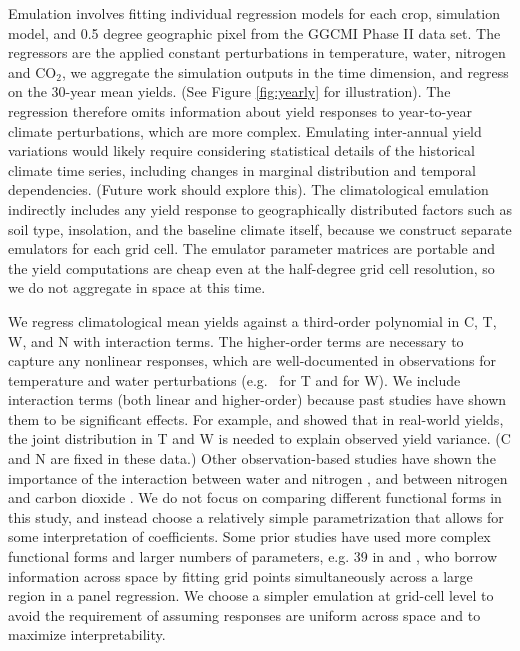 \documentclass[preprint, 5p, times, twocolumn]{elsarticle}
\begin{document}
Emulation involves fitting individual regression models for each crop, simulation model, and 0.5 degree geographic pixel from the GGCMI Phase II data set. The regressors are the applied constant perturbations in temperature, water, nitrogen and CO$_2$, we aggregate the simulation outputs in the time dimension, and regress on the 30-year mean yields. (See Figure \ref{fig:yearly} for illustration). The regression therefore omits information about yield responses to year-to-year climate perturbations, which are more complex. Emulating inter-annual yield variations would likely require considering statistical details of the historical climate time series, including changes in marginal distribution and temporal dependencies. (Future work should explore this). The climatological emulation indirectly includes any yield response to geographically distributed factors such as soil type, insolation, and the baseline climate itself, because we construct separate emulators for each grid cell. The emulator parameter matrices are portable and the yield computations are cheap even at the half-degree grid cell resolution, so we do not aggregate in space at this time.

We regress climatological mean yields against a third-order polynomial in C, T, W, and N with interaction terms. The higher-order terms are necessary to capture any nonlinear responses, which are well-documented in observations for temperature and water perturbations (e.g.\ \citet{Schlenker2009} for T and \citet{He2016} for W). We include interaction terms (both linear and higher-order) because past studies have shown them to be significant effects. For example, \citet{Lobell2007} and \citet{Tebaldi2008} showed that in real-world yields, the joint distribution in T and W is needed to explain observed yield variance. (C and N are fixed in these data.) Other observation-based studies have shown the importance of the interaction between water and nitrogen \citep[e.g.][]{AULAKH2005}, and between nitrogen and carbon dioxide \citep{Mitsuru92, Nakamura97}. We do not focus on comparing different functional forms in this study, and instead choose a relatively simple parametrization that allows for some interpretation of coefficients. Some prior studies have used more complex functional forms and larger numbers of parameters, e.g. 39 in \citet{BLANC2015} and \citet{BLANC2017}, who borrow information across space by fitting grid points simultaneously across a large region in a panel regression. {\color{red}We choose a simpler emulation at grid-cell level to avoid the requirement of assuming responses are uniform across space and to maximize interpretability.}
\end{document}
